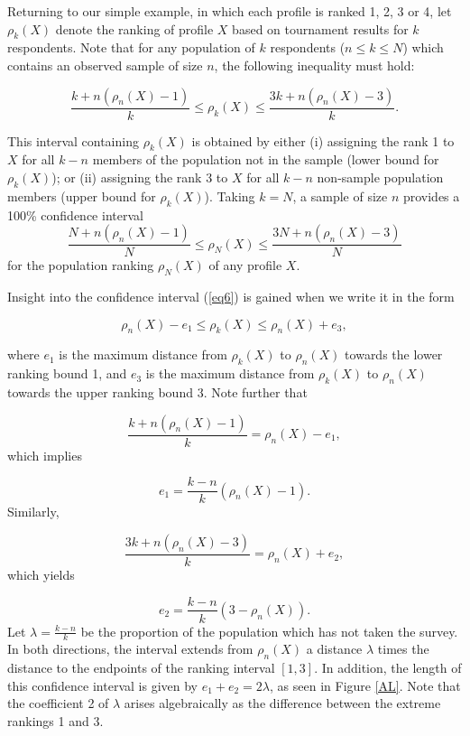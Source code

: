\documentclass[a4paper, 12pt]{article}
\begin{document}
Returning to our simple example, in which each profile is ranked 1, 2, 3 or 4, let $\rho_k(X)$ denote the ranking of profile $X$ based on tournament results for $k$ respondents. Note that for any population of $k$ respondents ($n\le k \le N$) which contains an observed sample of size $n$, the following inequality must hold:

\begin{equation}
\frac{k+n(\rho_n(X)-1)}{k}\le \rho_k(X)  \le \frac{3k+n(\rho_n(X)-3)}{k}.
\label{eq6}
\end{equation}

{\flushleft This} interval containing $\rho_k(X) $ is obtained by either (i) assigning the  rank 1 to $X$ for all $k-n$ members of the population not in the sample (lower bound for $\rho_k(X)$); or (ii) assigning the rank 3 to $X$  for all $k-n$ non-sample population members (upper bound for $\rho_k(X)$). Taking $k=N$, a sample of size $n$ provides  a 100\% confidence interval $$\frac{N+n(\rho_n(X)-1)}{N}\le \rho_N(X)  \le \frac{3N+n(\rho_n(X)-3)}{N}$$ for the population ranking $\rho_N(X)$ of any profile $X$.

Insight into the confidence interval (\ref{eq6}) is gained when we write it in the form

\begin{equation}
\rho_n(X)-e_1 \le \rho_k(X) \le \rho_n(X)+e_3,
\end{equation}
\label{eq:9}

{\flushleft where} $e_1$ is the maximum distance from $\rho_k(X)$ to $\rho_n(X)$ towards the lower ranking bound 1, and $e_3$ is the maximum distance  from $\rho_k(X)$ to $\rho_n(X)$ towards the upper ranking bound 3. Note further that


\begin{equation}
\frac{k+n(\rho_n(X)-1)}{k} = \rho_n(X)-e_1,
\end{equation}
\label{eq:10}
{\flushleft which implies}

\begin{equation}
e_1 = \frac{k-n}{k}(\rho_n(X)-1).
\end{equation}
\label{eq:11}
{\flushleft Similarly,}

\begin{equation}
\frac{3k+n(\rho_n(X)-3)}{k} = \rho_n(X)+e_2,
\end{equation}
\label{eq:12}
{\flushleft which} yields

\begin{equation}
e_2=\frac{k-n}{k}(3-\rho_n(X)).
\end{equation}
\label{eq:13}
{\flushleft Let} $\lambda=\frac{k-n}{k}$ be the proportion of the population which has not taken the survey. In both directions, the interval extends from $\rho_n(X)$ a distance $\lambda$ times the distance to the endpoints of the ranking interval $[1, 3]$. In addition, the length of this confidence interval is given by  $e_1+e_2=2\lambda$, as seen in Figure \ref{AL}. Note that the coefficient 2 of $\lambda$ arises algebraically as the difference between  the extreme rankings 1 and 3.
\end{document}
